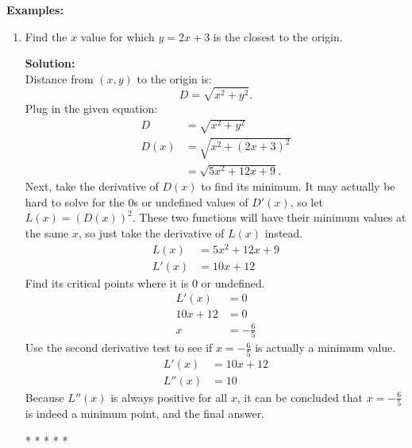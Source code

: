 \documentclass[12pt]{article}
\begin{document}
            \noindent \textbf{Examples:}
            \begin{enumerate}
                \item Find the $x$ value for which $y=2x+3$ is the closest to the origin.

                \noindent \textbf{Solution:}
                    \\ Distance from $(x, y)$ to the origin is:
                    \[ D = \sqrt{x^2 + y^2}. \]
                    Plug in the given equation:
                    \begin{align*}
                        D &= \sqrt{x^2 + y^2} \\
                        D(x) &= \sqrt{x^2 + (2x+3)^2} \\
                        &= \sqrt{5x^2 + 12x + 9}.
                    \end{align*}
                    Next, take the derivative of $D(x)$ to find its minimum. It may actually be hard to solve for the $0$s or undefined values of $D'(x)$, so let $L(x) = \left( D(x) \right )^2$. These two functions will have their minimum values at the same $x$, so just take the derivative of $L(x)$ instead.
                    \begin{align*}
                        L(x) &= 5x^2 + 12x + 9 \\
                        L'(x) &= 10x + 12
                    \end{align*}
                    Find its critical points where it is $0$ or undefined.
                    \begin{align*}
                        L'(x) &= 0 \\
                        10x + 12 &= 0 \\
                        x &= -\frac{6}{5}
                    \end{align*}
                    Use the second derivative test to see if $x=-\frac{6}{5}$ is actually a minimum value.
                    \begin{align*}
                        L'(x) &= 10x + 12 \\
                        L''(x) &= 10
                    \end{align*}
                    Because $L''(x)$ is always positive for all $x$, it can be concluded that $x=-\frac{6}{5}$ is indeed a minimum point, and the final answer.

                    \begin{center}
                        * * * * *
                    \end{center}


\end{enumerate}
\end{document}
